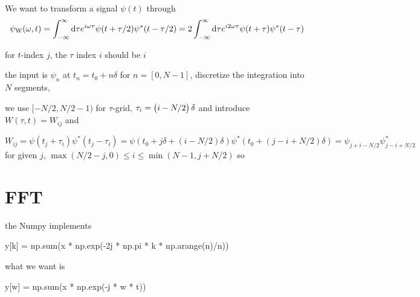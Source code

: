 \documentclass[a4paper,12pt]{book}
\newcommand{\intf}{\int_{-\infty}^{\infty}}
\newcommand{\be}{\begin{equation}}
\newcommand{\ee}{\end{equation}}
\begin{document}
We want to transform a signal $\psi(t)$ through
\be
\psi_\text{W}(\omega , t) = \intf \dif \tau e^{i\omega \tau} \psi(t + \tau/2)\psi^*(t - \tau/2) = 2 \intf \dif \tau e^{i2 \omega \tau} \psi(t + \tau)\psi^*(t - \tau)
\ee

for $t$-index $j$, the $\tau$ index $i$ should be $i$

the input is $\psi_n$ at $t_n = t_0 + n\delta$ for $n = [0, N-1]$, discretize the integration into $N$ segments,

we use $[-N/2, N/2-1)$ for $\tau$-grid,  $\tau_i = \del{i  - N/2} \delta $
and introduce $W(\tau, t) = W_{ij}$
and

\be
W_{ij} = \psi(t_j + \tau_i) \psi^*(t_j - \tau_i) = \psi(t_0 + j \delta + (i-N/2) \delta ) \psi^*(t_0 + (j - i + N/2)\delta ) = \psi_{j + i - N/2} \psi^*_{j-i+N/2}
\ee
for given $j$,
$  \max(N/2 - j, 0) \le i  \le \min(N-1, j+N/2)$ so

\section{FFT}
the Numpy implements

y[k] = np.sum(x * np.exp(-2j * np.pi * k * np.arange(n)/n))

what we want is

 y[w] = np.sum(x * np.exp(-j * w * t))

\backmatter


\end{document}
